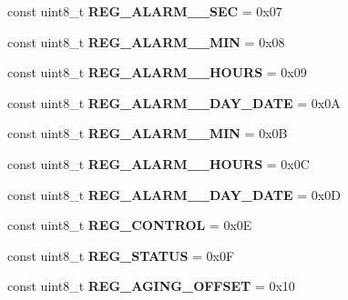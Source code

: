 \begin{DoxyCompactItemize}
\item 
\mbox{\label{class_d_s3231_a90aab5b318631c1d5bfb38ebcee822ac}} 
const uint8\+\_\+t {\bfseries R\+E\+G\+\_\+\+A\+L\+A\+R\+M\+\_\+\_\+\+S\+EC} = 0x07
\item 
\mbox{\label{class_d_s3231_a31ea11d7f117cd181868b76c7580ff9a}} 
const uint8\+\_\+t {\bfseries R\+E\+G\+\_\+\+A\+L\+A\+R\+M\+\_\+\_\+\+M\+IN} = 0x08
\item 
\mbox{\label{class_d_s3231_a38f8b765f3a23dcf6e1e402b6b4955a4}} 
const uint8\+\_\+t {\bfseries R\+E\+G\+\_\+\+A\+L\+A\+R\+M\+\_\+\_\+\+H\+O\+U\+RS} = 0x09
\item 
\mbox{\label{class_d_s3231_ae16ac34f6a6d25ec7709745b1671a34c}} 
const uint8\+\_\+t {\bfseries R\+E\+G\+\_\+\+A\+L\+A\+R\+M\+\_\+\_\+\+D\+A\+Y\+\_\+\+D\+A\+TE} = 0x0A
\item 
\mbox{\label{class_d_s3231_aca2b9311735fff7dded9877d48e8284d}} 
const uint8\+\_\+t {\bfseries R\+E\+G\+\_\+\+A\+L\+A\+R\+M\+\_\+\_\+\+M\+IN} = 0x0B
\item 
\mbox{\label{class_d_s3231_ac8f2d234a9e303fe71b52a32a3571d7d}} 
const uint8\+\_\+t {\bfseries R\+E\+G\+\_\+\+A\+L\+A\+R\+M\+\_\+\_\+\+H\+O\+U\+RS} = 0x0C
\item 
\mbox{\label{class_d_s3231_a05deee6f4c941a37c95f773cc7a369a3}} 
const uint8\+\_\+t {\bfseries R\+E\+G\+\_\+\+A\+L\+A\+R\+M\+\_\+\_\+\+D\+A\+Y\+\_\+\+D\+A\+TE} = 0x0D
\item 
\mbox{\label{class_d_s3231_adc5a414930fd2cf9038dd3096ed4da1f}} 
const uint8\+\_\+t {\bfseries R\+E\+G\+\_\+\+C\+O\+N\+T\+R\+OL} = 0x0E
\item 
\mbox{\label{class_d_s3231_a242154f8eff5f7005d47c394b02251de}} 
const uint8\+\_\+t {\bfseries R\+E\+G\+\_\+\+S\+T\+A\+T\+US} = 0x0F
\item 
\mbox{\label{class_d_s3231_a8a48b6c5dc799fce792806d8307a869e}} 
const uint8\+\_\+t {\bfseries R\+E\+G\+\_\+\+A\+G\+I\+N\+G\+\_\+\+O\+F\+F\+S\+ET} = 0x10

\end{DoxyCompactItemize}
